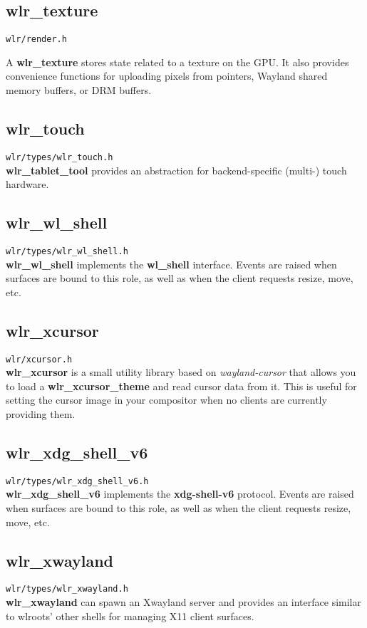 \documentclass{article}
\newcommand{\code}[1]{\texttt{#1}}
\begin{document}
\subsection{wlr_texture}\label{wlr texture}

\code{wlr/render.h}

A \textbf{wlr_texture} stores state related to a texture on the GPU. It also
provides convenience functions for uploading pixels from pointers, Wayland
shared memory buffers, or DRM buffers.

\subsection{wlr_touch}\label{wlr touch}

\code{wlr/types/wlr_touch.h}\\

\textbf{wlr_tablet_tool} provides an abstraction for backend-specific (multi-)
touch hardware.

\subsection{wlr_wl_shell}\label{wlr wl shell}

\code{wlr/types/wlr_wl_shell.h}\\

\textbf{wlr_wl_shell} implements the \textbf{wl_shell} interface. Events are
raised when surfaces are bound to this role, as well as when the client requests
resize, move, etc.

\subsection{wlr_xcursor}\label{wlr xcursor}

\code{wlr/xcursor.h}\\

\textbf{wlr_xcursor} is a small utility library based on \emph{wayland-cursor}
that allows you to load a \textbf{wlr_xcursor_theme} and read cursor data from
it. This is useful for setting the cursor image in your compositor when no
clients are currently providing them.

\subsection{wlr_xdg_shell_v6}\label{wlr xdg shell v6}

\code{wlr/types/wlr_xdg_shell_v6.h}\\

\textbf{wlr_xdg_shell_v6} implements the \textbf{xdg-shell-v6} protocol. Events
are raised when surfaces are bound to this role, as well as when the client
requests resize, move, etc.

\subsection{wlr_xwayland}\label{wlr xwayland}

\code{wlr/types/wlr_xwayland.h}\\

\textbf{wlr_xwayland} can spawn an Xwayland server and provides an interface
similar to wlroots' other shells for managing X11 client surfaces.
\end{document}
